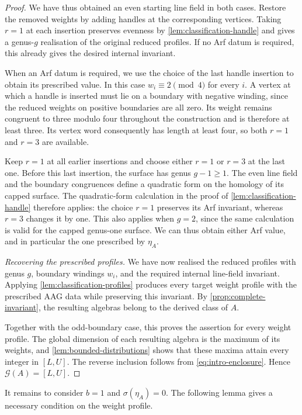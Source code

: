 \documentclass[11pt]{amsart}
\theoremstyle{definition}
\theoremstyle{plain}
\theoremstyle{definition}
\theoremstyle{definition}
\newcommand{\GSpec}{\mathcal G}
\begin{document}
\begin{proof}
We have thus obtained an even starting line field in
both cases.
Restore the removed weights by adding handles at the
corresponding vertices.
Taking $r=1$ at each insertion preserves evenness by
\cref{lem:classification-handle} and gives a genus-$g$
realisation of the original reduced profiles.
If no Arf datum is required, this already gives the
desired internal invariant.

When an Arf datum is required, we use the choice of
the last handle insertion to obtain its prescribed value.
In this case $w_i\equiv2\pmod4$ for every $i$.
A vertex at which a handle is inserted must lie on a
boundary with negative winding, since the reduced
weights on positive boundaries are all zero.
Its weight remains congruent to three modulo four
throughout the construction and is therefore at least
three.
Its vertex word consequently has length at least four,
so both $r=1$ and $r=3$ are available.

Keep $r=1$ at all earlier insertions and choose either
$r=1$ or $r=3$ at the last one.
Before this last insertion, the surface has genus
$g-1\geq1$.
The even line field and the boundary congruences define
a quadratic form on the homology of its capped surface.
The quadratic-form calculation in the proof of
\cref{lem:classification-handle} therefore applies:
the choice $r=1$ preserves its Arf invariant, whereas
$r=3$ changes it by one.
This also applies when $g=2$, since the same calculation
is valid for the capped genus-one surface.
We can thus obtain either Arf value, and in particular
the one prescribed by $\eta_A$.

\smallskip
\noindent\emph{Recovering the prescribed profiles.}
We have now realised the reduced profiles with genus
$g$, boundary windings $w_i$, and the required internal
line-field invariant.
Applying \cref{lem:classification-profiles} produces
every target weight profile with the prescribed AAG
data while preserving this invariant.
By \cref{prop:complete-invariant}, the resulting
algebras belong to the derived class of $A$.

Together with the odd-boundary case, this proves the
assertion for every weight profile.
The global dimension of each resulting algebra is
the maximum of its weights, and
\cref{lem:bounded-distributions} shows that these
maxima attain every integer in $[L,U]$.
The reverse inclusion follows from
\eqref{eq:intro-enclosure}.
Hence $\GSpec(A)=[L,U]$.
\end{proof}
It remains to consider $b=1$ and $\sigma(\eta_A)=0$.
The following lemma gives a necessary condition on the
weight profile.
\end{document}
